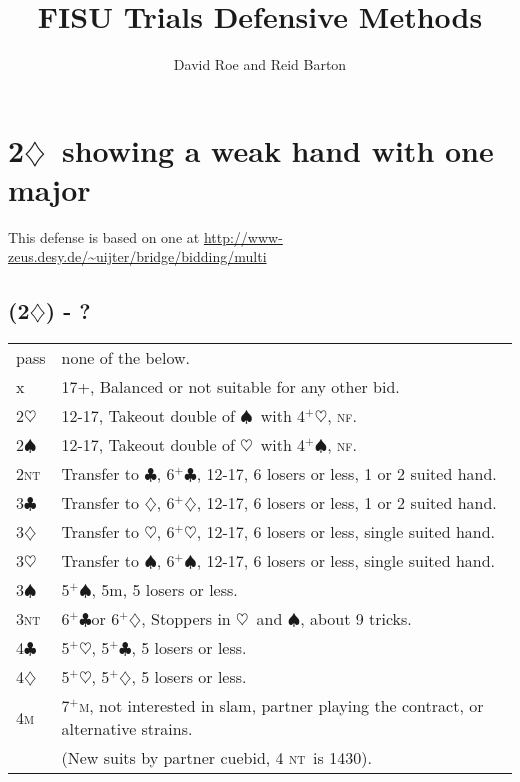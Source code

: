 \documentclass{article}
\title{FISU Trials Defensive Methods}
\author{David Roe and Reid Barton}
\newcommand{\nf}{\textsc{nf}}
\renewcommand{\c}{\ensuremath{\clubsuit}}
\renewcommand{\d}{\ensuremath{\diamondsuit}}
\newcommand{\h}{\ensuremath{\heartsuit}}
\newcommand{\s}{\ensuremath{\spadesuit}}
\newcommand{\nt}{\textsc{nt}}
\newcommand{\+}{\ensuremath{^+}}
\newcommand{\M}{\textsc{m}}
\begin{document}
\maketitle

\section{2\d\ showing a weak hand with one major}

This defense is based on one at \url{http://www-zeus.desy.de/~uijter/bridge/bidding/multi}

\subsection{(2\d) - ?}
\begin{tabular}{ll}
pass & none of the below. \\
x & 17+, Balanced or not suitable for any other bid.\\
2\h & 12-17, Takeout double of \s\ with 4\+\h, \nf.\\
2\s & 12-17, Takeout double of \h\ with 4\+\s, \nf.\\
2\nt & Transfer to \c, 6\+\c, 12-17, 6 losers or less, 1 or 2 suited hand.\\
3\c & Transfer to \d, 6\+\d, 12-17, 6 losers or less, 1 or 2 suited hand.\\
3\d & Transfer to \h, 6\+\h, 12-17, 6 losers or less, single suited hand.\\
3\h & Transfer to \s, 6\+\s, 12-17, 6 losers or less, single suited hand.\\
3\s & 5\+\s, 5m, 5 losers or less.\\
3\nt & 6\+\c or 6\+\d, Stoppers in \h\ and \s, about 9 tricks.\\
4\c & 5\+\h, 5\+\c, 5 losers or less.\\
4\d & 5\+\h, 5\+\d, 5 losers or less.\\
4\M & 7\+\M, not interested in slam, partner playing the contract, or alternative strains. \\
&(New suits by partner cuebid, 4 \nt\ is 1430).
\end{tabular}
\end{document}
